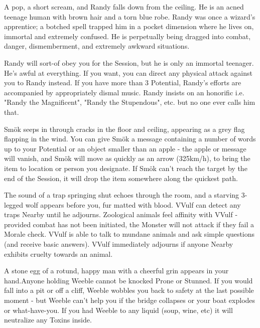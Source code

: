 {

A pop, a short scream, and Randy falls down from the ceiling.  He is an acned teenage human with brown hair and a torn blue robe.  Randy was once a wizard's apprentice; a botched spell trapped him in a pocket dimension where he lives on, immortal and extremely confused. He is perpetually being dragged into combat, danger, dismemberment, and extremely awkward situations. 

Randy will sort-of obey you for the Session, but he is only an immortal teenager. He's awful at everything. If you want, you can direct any physical attack against you to Randy instead.  If you have more than 3 Potential, Randy's efforts are accompanied by appropriately dismal music.  Randy insists on an honorific i.e. "Randy the Magnificent", "Randy the Stupendous", etc. but no one ever calls him that.


Smök seeps in through cracks in the floor and ceiling, appearing as a grey flag flapping in the wind.  You can give Smök a message containing a number of words up to your Potential or an object smaller than an apple - the apple or message will vanish, and Smök will move as quickly as an arrow (325km/h), to bring the item to location or person you designate.  If Smök can't reach the target by the end of the Session, it will drop the item somewhere along the quickest path.



The sound of a trap springing shut echoes through the room, and a starving 3-legged wolf appears before you, fur matted with blood.  VVulf can detect any traps Nearby until he adjourns.  Zoological animals feel affinity with VVulf - provided combat has not been initiated, the Monster will not attack if they fail a Morale check.  VVulf is able to talk to mundane animals and ask simple questions (and receive basic answers).  VVulf immediately adjourns if anyone Nearby exhibits cruelty towards an animal.


A stone egg of a rotund, happy man with a cheerful grin appears in your hand.Anyone holding Weeble cannot be knocked Prone or Stunned.  If you would fall into a pit or off a cliff, Weeble wobbles you back to safety at the last possible moment - but Weeble can't help you if the bridge collapses or your boat explodes or what-have-you.  If you had Weeble to any liquid (soup, wine, etc) it will neutralize any Toxins inside.



}
